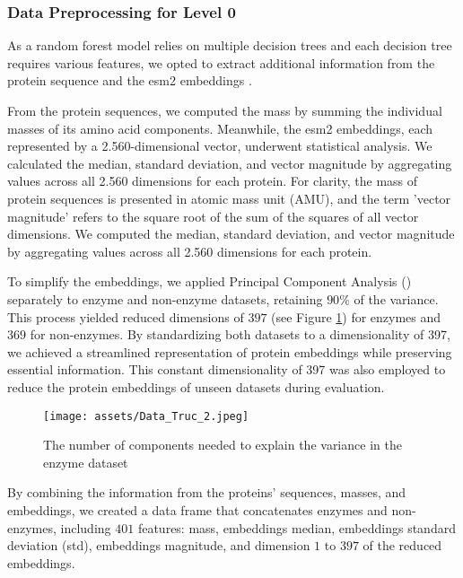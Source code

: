 \documentclass{bioinfo}
\begin{document}
\begin{methods}
\subsubsection{Data Preprocessing for Level 0}
As a random forest model relies on multiple decision trees and each
decision tree requires various features, we opted to extract additional
information from the protein sequence and the esm2 embeddings \cite{ESM2}.

From the protein sequences, we computed the mass by summing the individual masses of its amino acid components. 
Meanwhile, the esm2 embeddings, each represented by a 2.560-dimensional vector, underwent statistical analysis.
We calculated the median, standard deviation, and vector magnitude by aggregating values across all 2.560 dimensions for each protein.
For clarity, the mass of protein sequences is presented in atomic mass unit (AMU),
and the term 'vector magnitude' refers to the square root of the sum of the squares of all vector dimensions.
We computed the median, standard deviation, and vector magnitude by aggregating values across all 2.560 dimensions for each protein.

To simplify the embeddings, we applied Principal Component Analysis (\cite{scikit-learn})
separately to enzyme and non-enzyme datasets,
retaining $90\%$ of the variance. This process yielded reduced dimensions of $397$ (see Figure \ref{fig:PCA_enzymes}) for enzymes and $369$ for non-enzymes. 
By standardizing both datasets to a dimensionality of 397, we achieved a streamlined representation of protein embeddings while preserving essential information.
This constant dimensionality of 397 was also employed to reduce the protein embeddings of unseen datasets during evaluation.

\begin{figure}[!tbp]
\texttt{[image: assets/Data\_Truc\_2.jpeg]}
\caption{The number of components needed to explain the variance in the enzyme dataset}\label{fig:PCA_enzymes}
\end{figure}



By combining the information from the proteins’ sequences, masses, and embeddings, we created a data frame that concatenates enzymes and non-enzymes,
including $401$ features: mass, embeddings median, embeddings standard deviation (std), embeddings magnitude, and dimension $1$ to $397$ of the reduced 
embeddings. 


\end{methods}
\end{document}
